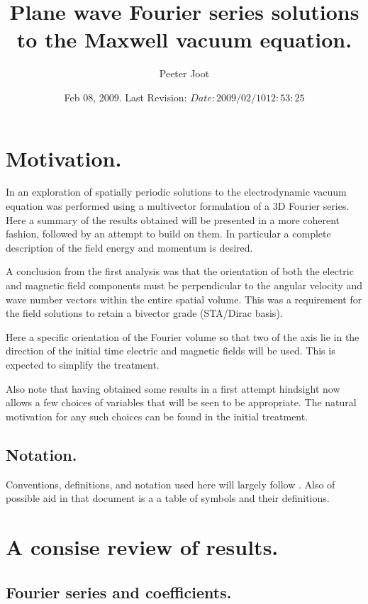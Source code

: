 \documentclass{article}
\title{ Plane wave Fourier series solutions to the Maxwell vacuum equation. }
\author{Peeter Joot}
\date{ Feb 08, 2009.  Last Revision: $Date: 2009/02/10 12:53:25 $ }
\begin{document}
\maketitle{}
\tableofcontents

\section{ Motivation. }

In \cite{PJFourierVacuum} an exploration of spatially periodic solutions to the electrodynamic vacuum equation was performed using a multivector formulation 
of a 3D Fourier series.
Here a summary of the results obtained will be presented in a more
coherent fashion, followed by an attempt to build on them.
In particular a complete
description of the field energy and momentum is desired.

A conclusion from the first analysis was that the
orientation of both the electric and magnetic field components
must be perpendicular to the angular velocity and wave number vectors 
within the entire spatial volume.  This was a requirement for the field
solutions to retain a bivector grade (STA/Dirac basis).

Here a specific orientation of the Fourier volume so that two of the axis
lie in the direction of the initial time electric and magnetic fields will be
used.  This is expected to simplify the treatment.

Also note that having obtained some results in a first attempt hindsight
now allows a few choices of variables that will be seen to be appropriate.
The natural motivation for any such choices can be found in the initial
treatment.

\subsection{ Notation. }

Conventions, definitions, and notation used here will largely follow
\cite{PJFourierVacuum}.  Also of possible aid in that document is a 
a table of symbols and their definitions.

\section{ A consise review of results. }

\subsection{ Fourier series and coefficients. }
\end{document}

